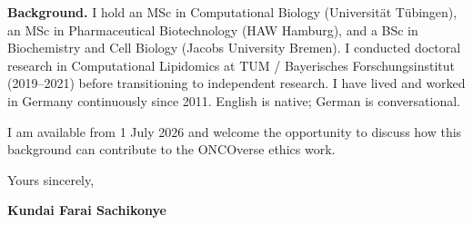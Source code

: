 \documentclass[12pt,a4paper]{article}
\begin{document}
\textbf{Background.}
I hold an MSc in Computational Biology (Universität Tübingen), an MSc in
Pharmaceutical Biotechnology (HAW Hamburg), and a BSc in Biochemistry and
Cell Biology (Jacobs University Bremen).
I conducted doctoral research in Computational Lipidomics at TUM / Bayerisches
Forschungsinstitut (2019--2021) before transitioning to independent research.
I have lived and worked in Germany continuously since 2011.
English is native; German is conversational.

I am available from 1 July 2026 and welcome the opportunity to discuss
how this background can contribute to the ONCOverse ethics work.

\vspace{1.5em}
Yours sincerely,

\vspace{2.5em}
\textbf{Kundai Farai Sachikonye}
\end{document}
